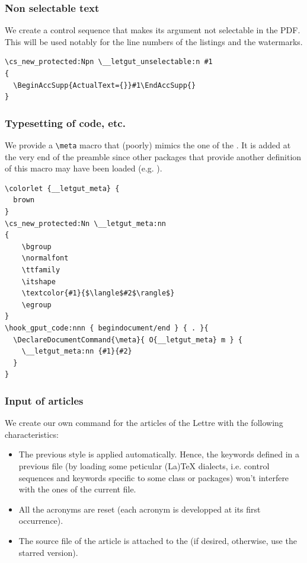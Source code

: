 \documentclass{letgut}
\begin{document}
\subsubsection{Non selectable text}
\label{ImplementationMiscellanousNonselectabletext-wh2h55h0jlj0}
We create a control sequence that makes its argument not selectable in the
PDF. This will be used notably for the line numbers of the listings and the
watermarks.
\begin{lstlisting}
\cs_new_protected:Npn \__letgut_unselectable:n #1
{
  \BeginAccSupp{ActualText={}}#1\EndAccSupp{}
}
\end{lstlisting}
\subsubsection{Typesetting of code, etc.}
\label{ImplementationMiscellanousTypesettingofcodeetc-f83h55h0jlj0}
We provide a \lstinline+\meta+ macro that (poorly) mimics the one of the
. It is added at the very end of the preamble since other
packages that provide another definition of this macro may have been loaded
(e.g. ).
\begin{lstlisting}
\colorlet {__letgut_meta} {
  brown
}
\cs_new_protected:Nn \__letgut_meta:nn
{
    \bgroup
    \normalfont
    \ttfamily
    \itshape
    \textcolor{#1}{$\langle$#2$\rangle$}
    \egroup
}
\hook_gput_code:nnn { begindocument/end } { . }{
  \DeclareDocumentCommand{\meta}{ O{__letgut_meta} m } {
    \__letgut_meta:nn {#1}{#2}
  }
}
\end{lstlisting}
\subsubsection{Input of articles}
\label{ImplementationMiscellanousInputofarticles-aqok3ja00pj0}
We create our own \lstinline++ command for the articles of the Lettre with the
following characteristics:

\begin{itemize}
\item The previous style is applied automatically. Hence, the keywords defined in
a previous file (by loading some peticular (La)\TeX{} dialects, i.e. control
sequences and keywords specific to some class or packages) won't interfere
with the ones of the current file.
\item All the acronyms are reset (each acronym is developped at its first occurrence).
\item The source file of the article is attached to the \pdf{} (if desired,
otherwise, use the starred version).
\end{itemize}
\end{document}
